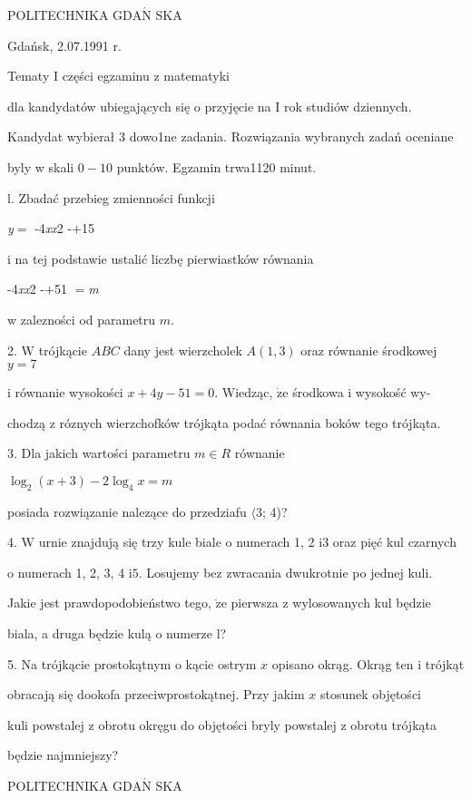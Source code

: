 \documentclass[a4paper,12pt]{article}
\begin{document}
POLITECHNIKA $\mathrm{G}\mathrm{D}\mathrm{A}\acute{\mathrm{N}}$ SKA

Gdańsk, 2.07.1991 r.

Tematy I części egzaminu z matematyki

dla kandydatów ubiegających się o przyjęcie na I rok studiów dziennych.

Kandydat wybierał 3 dowo1ne zadania. Rozwiązania wybranych zadań oceniane

byly w skali $0-10$ punktów. Egzamin trwa1120 minut.

l. Zbadać przebieg zmienności funkcji

{\it y}$=$ -4{\it xx}2 -$+$15

i na tej podstawie ustalić liczbę pierwiastków równania

-4{\it xx}2 -$+$51 $=${\it m}

w zalezności od parametru $m.$

2. $\mathrm{W}$ trójkącie $ABC$ dany jest wierzcholek $A(1,3)$ oraz równanie środkowej $y=7$

i równanie wysokości $x+4y-51=0$. Wiedząc, $\dot{\mathrm{z}}\mathrm{e}$ środkowa i wysokość wy-

chodzą z róznych wierzchofków trójkąta podać równania boków tego trójkąta.

3. Dla jakich wartości parametru $m\in R$ równanie

$\log_{2}(x+3)-2\log_{4}x=m$

posiada rozwiązanie nalezące do przedziafu $\langle$3; 4)?

4. $\mathrm{W}$ urnie znajdują się trzy kule biale o numerach 1, 2 $\mathrm{i}3$ oraz pięć kul czarnych

o numerach 1, 2, 3, 4 $\mathrm{i}5$. Losujemy bez zwracania dwukrotnie po jednej kuli.

Jakie jest prawdopodobieństwo tego, $\dot{\mathrm{z}}\mathrm{e}$ pierwsza z wylosowanych kul będzie

biala, a druga będzie kulą o numerze l?

5. Na trójkącie prostokątnym o kącie ostrym $x$ opisano okrąg. Okrąg ten i trójkąt

obracają się dookofa przeciwprostokątnej. Przy jakim $x$ stosunek objętości

kuli powstalej z obrotu okręgu do objętości bryly powstalej z obrotu trójkąta

będzie najmniejszy?




POLITECHNIKA $\mathrm{G}\mathrm{D}\mathrm{A}\acute{\mathrm{N}}$ SKA
\end{document}
